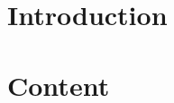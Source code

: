 \documentclass[
    minted,                 %
    todo=margin,            %
    definitionindex,        %
]{UniLeipzigBioinfThesis}
\begin{document}
\makefrontmatter

\beginmainmatter

\part{Introduction}

\part{Content}



% 

\beginappendix



% 

\makebackmatter
\end{document}
